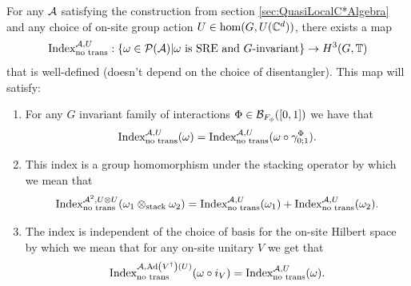 \documentclass[11pt,a4paper,twoside]{article}
\numberwithin{equation}{section}
\begin{document}
	\begin{theorem}\label{thrm:ExistenceOriginalIndex}
		For any $\AA$ satisfying the construction from section \ref{sec:QuasiLocalC*Algebra} and any choice of on-site group action $U\in\hom(G,U(\CC^d))$, there exists a map
		\begin{equation}
			\textrm{Index}^{\AA,U}_{\text{no trans}}:\{\omega\in\PP(\AA)| \omega\text{ is SRE and }G\text{-invariant}\}\rightarrow H^3(G,\TT)
		\end{equation}
		that is well-defined (doesn't depend on the choice of disentangler). This map will satisfy:
		\begin{enumerate}
			\item For any $G$ invariant family of interactions $\Phi\in\BB_{F_\phi}([0,1])$ we have that
			\begin{equation}
				\textrm{Index}^{\AA,U}_{\text{no trans}}(\omega)=\textrm{Index}^{\AA,U}_{\text{no trans}}(\omega\circ\gamma^\Phi_{0;1}).
			\end{equation}
			\item This index is a group homomorphism under the stacking operator by which we mean that
			\begin{equation}
				\textrm{Index}_{\text{no trans}}^{\AA^2,U\otimes U}(\omega_1\otimes_{\text{stack}}\omega_2)=\textrm{Index}_{\text{no trans}}^{\AA,U}(\omega_1)+\textrm{Index}_{\text{no trans}}^{\AA,U}(\omega_2).
			\end{equation}
			\item The index is independent of the choice of basis for the on-site Hilbert space by which we mean that for any on-site unitary $V$ we get that
			\begin{equation}
				\textrm{Index}^{\AA,\Ad{V^\dagger}(U)}_{\text{no trans}}(\omega\circ i_V) =\textrm{Index}^{\AA,U}_{\text{no trans}}(\omega).
			\end{equation}
		\end{enumerate}
	\end{theorem}
\end{document}
